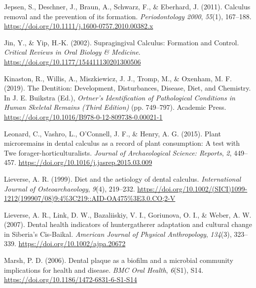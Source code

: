 \documentclass[
  b5paper,
]{book}
\newlength{\cslhangindent}
\newlength{\cslentryspacingunit} %
\newenvironment{CSLReferences}[2] %
 {%
  \setlength{\parindent}{0pt}
  \ifodd #1
  \let\oldpar\par
  \def\par{\hangindent=\cslhangindent\oldpar}
  \fi
  \setlength{\parskip}{#2\cslentryspacingunit}
 }%
 {}
\begin{document}
\begin{CSLReferences}{1}{0}
\leavevmode{}%
Jepsen, S., Deschner, J., Braun, A., Schwarz, F., \& Eberhard, J.
(2011). Calculus removal and the prevention of its formation.
\emph{Periodontology 2000}, \emph{55}(1), 167--188.
\url{https://doi.org/10.1111/j.1600-0757.2010.00382.x}

\leavevmode{}%
Jin, Y., \& Yip, H.-K. (2002). Supragingival {Calculus}: {Formation} and
{Control}. \emph{Critical Reviews in Oral Biology \& Medicine}.
\url{https://doi.org/10.1177/154411130201300506}

\leavevmode{}%
Kinaston, R., Willis, A., Miszkiewicz, J. J., Tromp, M., \& Oxenham, M.
F. (2019). The {Dentition}: {Development}, {Disturbances}, {Disease},
{Diet}, and {Chemistry}. In J. E. Buikstra (Ed.), \emph{Ortner's
{Identification} of {Pathological Conditions} in {Human Skeletal
Remains} ({Third Edition})} (pp. 749--797). {Academic Press}.
\url{https://doi.org/10.1016/B978-0-12-809738-0.00021-1}

\leavevmode{}%
Leonard, C., Vashro, L., O'Connell, J. F., \& Henry, A. G. (2015). Plant
microremains in dental calculus as a record of plant consumption: {A}
test with {Twe} forager-horticulturalists. \emph{Journal of
Archaeological Science: Reports}, \emph{2}, 449--457.
\url{https://doi.org/10.1016/j.jasrep.2015.03.009}

\leavevmode{}%
Lieverse, A. R. (1999). Diet and the aetiology of dental calculus.
\emph{International Journal of Osteoarchaeology}, \emph{9}(4), 219--232.
\url{https://doi.org/10.1002/(SICI)1099-1212(199907/08)9:4\%3C219::AID-OA475\%3E3.0.CO;2-V}

\leavevmode{}%
Lieverse, A. R., Link, D. W., Bazaliiskiy, V. I., Goriunova, O. I., \&
Weber, A. W. (2007). Dental health indicators of
hunter{\textendash}gatherer adaptation and cultural change in
{Siberia}'s {Cis-Baikal}. \emph{American Journal of Physical
Anthropology}, \emph{134}(3), 323--339.
\url{https://doi.org/10.1002/ajpa.20672}

\leavevmode{}%
Marsh, P. D. (2006). Dental plaque as a biofilm and a microbial
community {\textendash} implications for health and disease. \emph{BMC
Oral Health}, \emph{6}(S1), S14.
\url{https://doi.org/10.1186/1472-6831-6-S1-S14}


\end{CSLReferences}
\end{document}
